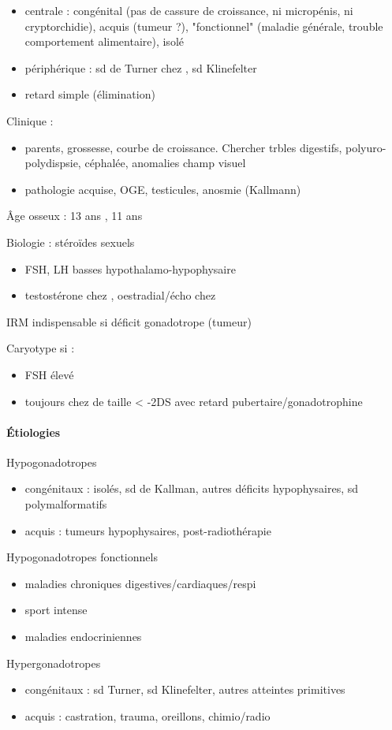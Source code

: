 \documentclass[11pt]{article}
\begin{document}
\begin{itemize}
\item centrale : congénital (pas de cassure de croissance, ni micropénis, ni
cryptorchidie), acquis (tumeur ?), "fonctionnel" (maladie générale, trouble
comportement alimentaire), isolé
\item périphérique : sd de Turner chez \female, sd Klinefelter \male
\item retard simple (élimination)
\end{itemize}

Clinique : 
\begin{itemize}
\item parents, grossesse, courbe de croissance. Chercher trbles digestifs, polyuro-polydispsie, céphalée, anomalies champ visuel
\item pathologie acquise, OGE, testicules, anosmie (Kallmann)
\end{itemize}

Âge osseux : 13 ans \male, 11 ans \female

Biologie : stéroïdes sexuels
\begin{itemize}
\item FSH, LH basses \thus hypothalamo-hypophysaire
\item testostérone chez \male, oestradial/écho chez \female
\end{itemize}

IRM indispensable si déficit gonadotrope (tumeur) \danger

Caryotype si :
\begin{itemize}
\item FSH élevé
\item toujours chez \female{} de taille < -2DS avec retard pubertaire/gonadotrophine \inc
\end{itemize}

\paragraph{Étiologies}
\label{sec:org50915e9}
Hypogonadotropes
\begin{itemize}
\item congénitaux : isolés, sd de Kallman, autres déficits hypophysaires, sd
polymalformatifs
\item acquis : tumeurs hypophysaires, post-radiothérapie
\end{itemize}
Hypogonadotropes fonctionnels
\begin{itemize}
\item maladies chroniques digestives/cardiaques/respi
\item sport intense
\item maladies endocriniennes
\end{itemize}
Hypergonadotropes
\begin{itemize}
\item congénitaux : sd Turner, sd Klinefelter, autres atteintes primitives
\item acquis : castration, trauma, oreillons, chimio/radio
\end{itemize}
\end{document}
